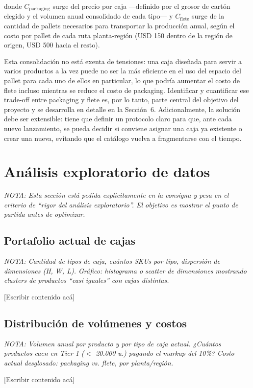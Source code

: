 \documentclass[11pt]{article}
\newcommand{\nota}[1]{{\itshape\color{notegray}\small NOTA: #1}\par\vspace{2pt}}
\newcommand{\placeholder}{\color{placeholdergray}[Escribir contenido acá]\color{black}\par\vspace{6pt}}
\begin{document}
donde $C_{\text{packaging}}$ surge del precio por caja ---definido por el grosor de cartón
elegido y el volumen anual consolidado de cada tipo--- y $C_{\text{flete}}$ surge de la
cantidad de pallets necesarios para transportar la producción anual, según el costo por
pallet de cada ruta planta-región (USD 150 dentro de la región de origen, USD 500 hacia el
resto).

Esta consolidación no está exenta de tensiones: una caja diseñada para servir a varios
productos a la vez puede no ser la más eficiente en el uso del espacio del pallet para
cada uno de ellos en particular, lo que podría aumentar el costo de flete incluso mientras
se reduce el costo de packaging. Identificar y cuantificar ese trade-off entre packaging y
flete es, por lo tanto, parte central del objetivo del proyecto y se desarrolla en detalle
en la Sección~6. Adicionalmente, la solución debe ser extensible: tiene que definir un
protocolo claro para que, ante cada nuevo lanzamiento, se pueda decidir si conviene
asignar una caja ya existente o crear una nueva, evitando que el catálogo vuelva a
fragmentarse con el tiempo.

\section{Análisis exploratorio de datos}
\nota{Esta sección está pedida explícitamente en la consigna y pesa en el criterio de ``rigor del análisis exploratorio''. El objetivo es mostrar el punto de partida antes de optimizar.}

\subsection{Portafolio actual de cajas}
\nota{Cantidad de tipos de caja, cuántos SKUs por tipo, dispersión de dimensiones (H, W, L). Gráfico: histograma o scatter de dimensiones mostrando clusters de productos ``casi iguales'' con cajas distintas.}
\placeholder

\subsection{Distribución de volúmenes y costos}
\nota{Volumen anual por producto y por tipo de caja actual. ¿Cuántos productos caen en Tier 1 ($<$ 20.000 u.) pagando el markup del 10\%? Costo actual desglosado: packaging vs. flete, por planta/región.}
\placeholder
\end{document}
